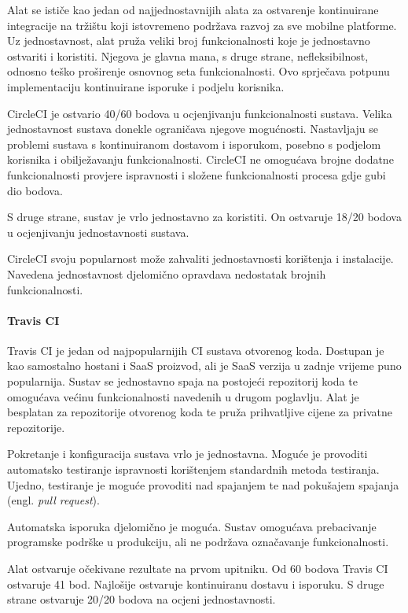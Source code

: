 \documentclass[times, utf8, diplomski, numeric]{fer}
\newcommand{\eng}[1]{(engl. \textit{#1})}
\begin{document}
Alat se ističe kao jedan od najjednostavnijih alata za ostvarenje kontinuirane integracije na tržištu koji istovremeno podržava razvoj za sve mobilne platforme. Uz jednostavnost, alat pruža veliki broj funkcionalnosti koje je jednostavno ostvariti i koristiti. Njegova je glavna mana, s druge strane, nefleksibilnost, odnosno teško proširenje osnovnog seta funkcionalnosti. Ovo sprječava potpunu implementaciju kontinuirane isporuke i podjelu korisnika.

CircleCI je ostvario 40/60 bodova u ocjenjivanju funkcionalnosti sustava. Velika jednostavnost sustava donekle ograničava njegove mogućnosti. Nastavljaju se problemi sustava s kontinuiranom dostavom i isporukom, posebno s podjelom korisnika i obilježavanju funkcionalnosti. CircleCI ne omogućava brojne dodatne funkcionalnosti provjere ispravnosti i složene funkcionalnosti procesa gdje gubi dio bodova.

S druge strane, sustav je vrlo jednostavno za koristiti. On ostvaruje 18/20 bodova u ocjenjivanju jednostavnosti sustava.

CircleCI svoju popularnost može zahvaliti jednostavnosti korištenja i instalacije. Navedena jednostavnost djelomično opravdava nedostatak brojnih funkcionalnosti.

\paragraph{Travis CI}
Travis CI je jedan od najpopularnijih CI sustava otvorenog koda. Dostupan je kao samostalno hostani i SaaS proizvod, ali je SaaS verzija u zadnje vrijeme puno popularnija. Sustav se jednostavno spaja na postojeći repozitorij koda te omogućava većinu funkcionalnosti navedenih u drugom poglavlju. Alat je besplatan za repozitorije otvorenog koda te pruža prihvatljive cijene za privatne repozitorije.

Pokretanje i konfiguracija sustava vrlo je jednostavna. Moguće je provoditi automatsko testiranje ispravnosti korištenjem standardnih metoda testiranja. Ujedno, testiranje je moguće provoditi nad spajanjem te nad pokušajem spajanja \eng{pull request}.

Automatska isporuka djelomično je moguća. Sustav omogućava prebacivanje programske podrške u produkciju, ali ne podržava označavanje funkcionalnosti.

Alat ostvaruje očekivane rezultate na prvom upitniku. Od 60 bodova Travis CI ostvaruje 41 bod. Najlošije ostvaruje kontinuiranu dostavu i isporuku. S druge strane ostvaruje 20/20 bodova na ocjeni jednostavnosti.
\end{document}
